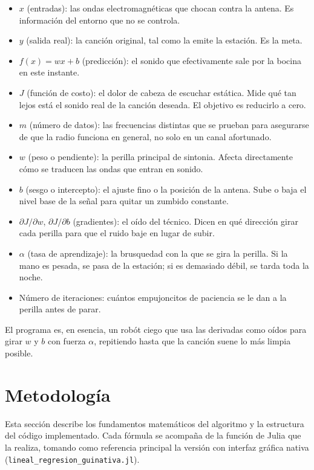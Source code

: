 \documentclass[11pt,a4paper]{article}
\begin{document}
\begin{itemize}
  \item $x$ (entradas): las ondas electromagn\'eticas que chocan contra la antena. Es informaci\'on del entorno que no se controla.
  \item $y$ (salida real): la canci\'on original, tal como la emite la estaci\'on. Es la meta.
  \item $f(x) = wx + b$ (predicci\'on): el sonido que efectivamente sale por la bocina en este instante.
  \item $J$ (funci\'on de costo): el dolor de cabeza de escuchar est\'atica. Mide qu\'e tan lejos est\'a el sonido real de la canci\'on deseada. El objetivo es reducirlo a cero.
  \item $m$ (n\'umero de datos): las frecuencias distintas que se prueban para asegurarse de que la radio funciona en general, no solo en un canal afortunado.
  \item $w$ (peso o pendiente): la perilla principal de sintonia. Afecta directamente c\'omo se traducen las ondas que entran en sonido.
  \item $b$ (sesgo o intercepto): el ajuste fino o la posici\'on de la antena. Sube o baja el nivel base de la se\~nal para quitar un zumbido constante.
  \item $\partial J/\partial w$, $\partial J/\partial b$ (gradientes): el o\'ido del t\'ecnico. Dicen en qu\'e direcci\'on girar cada perilla para que el ruido baje en lugar de subir.
  \item $\alpha$ (tasa de aprendizaje): la brusquedad con la que se gira la perilla. Si la mano es pesada, se pasa de la estaci\'on; si es demasiado d\'ebil, se tarda toda la noche.
  \item N\'umero de iteraciones: cu\'antos empujoncitos de paciencia se le dan a la perilla antes de parar.
\end{itemize}

El programa es, en esencia, un rob\'ot ciego que usa las derivadas como o\'idos para girar $w$ y $b$ con fuerza $\alpha$, repitiendo hasta que la canci\'on suene lo m\'as limpia posible.

\section{Metodolog\'ia}

Esta secci\'on describe los fundamentos matem\'aticos del algoritmo y la estructura del c\'odigo implementado. Cada f\'ormula se acompa\~na de la funci\'on de Julia que la realiza, tomando como referencia principal la versi\'on con interfaz gr\'afica nativa (\texttt{lineal\_regresion\_guinativa.jl}).
\end{document}
